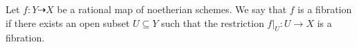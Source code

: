     \begin{definition}\label{def:fibration_of_rational_map}
        Let \(f: Y \dashrightarrow X\) be a rational map of noetherian schemes.
        We say that \(f\) is a fibration if there exists an open subset \(U \subseteq Y\) such that the restriction \(f|_U : U \to X\) is a fibration.
    \end{definition}
